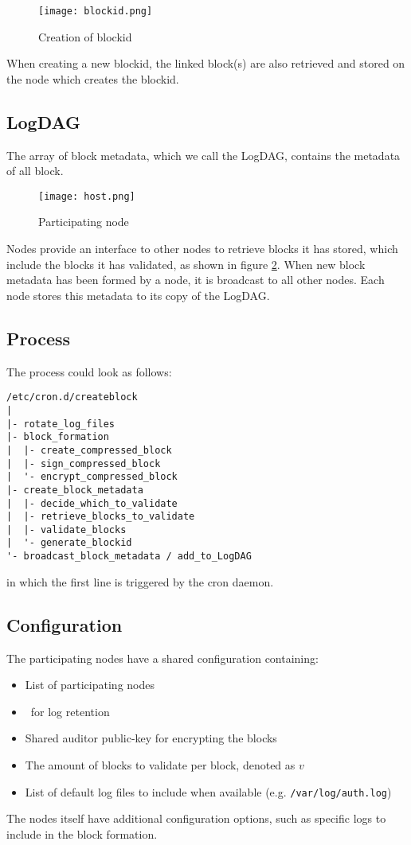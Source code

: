 \begin{figure}[H]
\centering \texttt{[image: blockid.png]}
\caption{ \label{fig:hash}  
Creation of blockid
}
\end{figure}

When creating a new blockid,
the linked block(s) are also retrieved and stored on the node which creates the blockid.

\subsection{LogDAG}

The array of block metadata,
which we call the LogDAG,
contains the metadata of all block.
\begin{figure}[H]
\centering \texttt{[image: host.png]}
\caption{ \label{fig:host}  
Participating node
}
\end{figure}
Nodes provide an interface to other nodes
to retrieve blocks it has stored,
which include the blocks it has validated,
as shown in figure \ref{fig:host}.
When new block metadata has been formed by a node,
it is broadcast to all other nodes.
Each node stores this metadata to its copy of the LogDAG.

\subsection{Process}

The process could look as follows:
\begin{lstlisting}
/etc/cron.d/createblock
|
|- rotate_log_files
|- block_formation
|  |- create_compressed_block
|  |- sign_compressed_block
|  '- encrypt_compressed_block
|- create_block_metadata
|  |- decide_which_to_validate
|  |- retrieve_blocks_to_validate
|  |- validate_blocks
|  '- generate_blockid
'- broadcast_block_metadata / add_to_LogDAG
\end{lstlisting}
in which the first line is triggered by the cron daemon.

\subsection{Configuration}

The participating nodes have a shared configuration containing:
\begin{itemize}
\item List of participating nodes
\item \ttl\ for log retention
\item Shared auditor public-key for encrypting the blocks
\item The amount of blocks to validate per block, denoted as $v$
\item List of default log files to include when available (e.g. \texttt{/var/log/auth.log})
\end{itemize}

The nodes itself have additional configuration options,
such as specific logs to include in the block formation.

